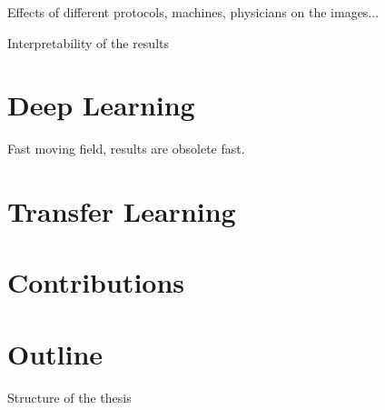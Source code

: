 Effects of different protocols, machines, physicians on the images...

Interpretability of the results

\section{Deep Learning}

Fast moving field, results are obsolete fast.

\section{Transfer Learning}

\section{Contributions}

\section{Outline}

Structure of the thesis

